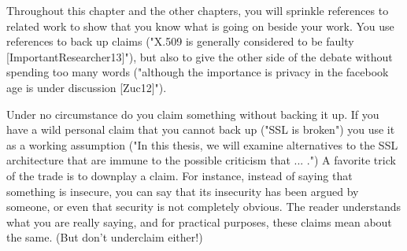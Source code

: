 Throughout this chapter and the other chapters, you will sprinkle
references to related work to show that you know what is going on
beside your work. You use references to back up claims
("X.509 is generally considered to be faulty
[ImportantResearcher13]"), but also to give the other side of the
debate without spending too many words ("although the importance is
privacy in the facebook age is under discussion [Zuc12]").

Under no circumstance do you claim something without backing it up.
If you have a wild personal claim that you cannot back up ("SSL is
broken") you use it as a working assumption ("In this thesis, we
will examine alternatives to the SSL architecture that are immune
to the possible criticism that ... .") A favorite trick of the
trade is to downplay a claim. For instance, instead of saying that
something is insecure, you can say that its insecurity has been
argued by someone, or even that security is not completely obvious.
The reader understands what you are really saying, and for practical
purposes, these claims mean about the same. (But don't underclaim
either!)